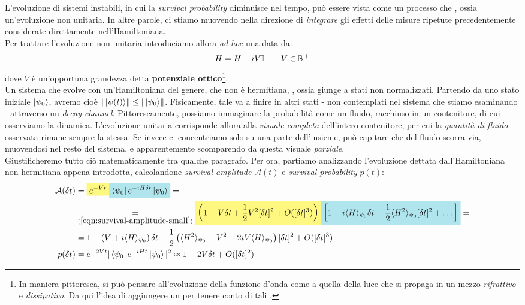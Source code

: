 \documentclass[../../InformazioneQuantistica.tex]{subfiles}
\begin{document}
L'evoluzione di sistemi instabili, in cui la \textit{survival probability} diminuisce nel tempo, può essere vista come un processo che , ossia un'evoluzione non unitaria. In altre parole, ci stiamo muovendo nella direzione di \textit{integrare} gli effetti delle misure ripetute precedentemente considerate direttamente nell'Hamiltoniana.\\

Per trattare l'evoluzione non unitaria introduciamo allora \textit{ad hoc} una  data da:
\begin{align}
H = H -i V\mathbb{I} \qquad V\in \mathbb{R}^+
\label{eqn:non-hermitian-Hamiltonian}
\end{align} 
dove $V$ è un'opportuna grandezza detta \textbf{potenziale ottico}\footnote{In maniera pittoresca, si può pensare all'evoluzione della funzione d'onda come a quella della luce che si propaga in un mezzo \textit{rifrattivo} e \textit{dissipativo}. Da qui l'idea di aggiungere un  per tenere conto di tali .}.\\
Un sistema che evolve con un'Hamiltoniana del genere, che non è hermitiana, , ossia giunge a stati non normalizzati. Partendo da uno stato iniziale $\Ket{\psi_0}$, avremo cioè $\left\lVert\Ket{\psi(t)}\right\rVert \leq \left\lVert\Ket{\psi_0}\right\rVert$. Fisicamente, tale  va a finire in altri stati - non contemplati nel sistema che stiamo esaminando - attraverso un \textit{decay channel}. Pittorescamente, possiamo immaginare la probabilità come un fluido, racchiuso in un contenitore, di cui osserviamo la dinamica. L'evoluzione unitaria corrisponde allora alla \textit{visuale completa} dell'intero contenitore, per cui la \textit{quantità di fluido} osservata rimane sempre la stessa. Se invece ci concentriamo solo su una parte dell'insieme, può capitare che del fluido scorra via, muovendosi nel resto del sistema, e apparentemente scomparendo da questa visuale \textit{parziale}.\\
Giustificheremo tutto ciò matematicamente tra qualche paragrafo. Per ora, partiamo analizzando l'evoluzione dettata dall'Hamiltoniana non hermitiana appena introdotta, calcolandone \textit{survival amplitude} $\mathcal{A}(t)$ e \textit{survival probability} $p(t)$:
\begin{align*}
\mathcal{A}(\delta t) &= \hlc{Yellow}{e^{-Vt}} \hlc{SkyBlue}{\bra{\psi_0} e^{-iH\delta t}\ket{\psi_0}}=\\
&\underset{(\ref{eqn:survival-amplitude-small})}{=}\hlc{Yellow}{\left(1-V\delta t + \frac{1}{2}V^2 [\delta t]^2 + O([\delta t]^3)\right)}\hlc{SkyBlue}{\left[1 - i\langle H \rangle_{\psi_0}\delta t-\frac{1}{2}\langle H^2 \rangle_{\psi_0}[\delta t]^2 + \dots \right]}=\\
&= 1-\left(V+i\langle H \rangle_{\psi_0}\right)\delta t -\frac{1}{2}\left(\langle H^2\rangle_{\psi_0} - V^2 - 2iV\langle H \rangle_{\psi_0} \right) [\delta t]^2 + O([\delta t]^3)\\
p(\delta t) &= e^{-2Vt} |\bra{\psi_0} e^{-iHt}\ket{\psi_0}|^2 \approx 1-2V \delta t + O([\delta t]^2)
\end{align*}
\end{document}
